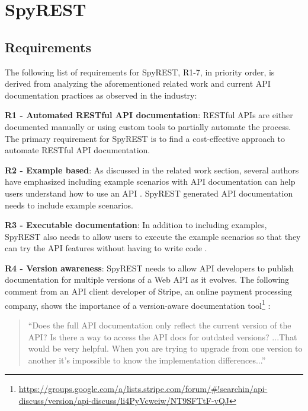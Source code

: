 \documentclass[conference]{IEEEtran}
\begin{document}
\section{SpyREST} %
\label{sec:spyrest}

\subsection{Requirements} %
\label{sub:spyrest_requirements}

The following list of requirements for SpyREST, R1-7, in priority order, is derived from analyzing the aforementioned related work and current API documentation practices as observed in the industry:

  \textbf{R1 - Automated RESTful API documentation}: RESTful APIs are either documented manually or using custom tools to partially automate the process. The primary requirement for SpyREST is to find a cost-effective approach to automate RESTful API documentation.

  \textbf{R2 - Example based}: As discussed in the related work section, several authors have emphasized including example scenarios with API documentation can help users understand how to use an API \cite{Robillard_what_makes, Kuhn_on_designing, Hoffman_api_documentation,Nasehi_what_makes}. SpyREST generated API documentation needs to include example scenarios.

  \textbf{R3 - Executable documentation}: In addition to including examples, SpyREST also needs to allow users to execute the example scenarios so that they can try the API features without having to write code \cite{Hoffman_api_documentation, Myers_study}.

  \textbf{R4 - Version awareness}: SpyREST needs to allow API developers to publish documentation for multiple versions of a Web API as it evolves. The following comment from an API client developer of Stripe, an online payment processing company, shows the importance of a version-aware documentation tool\footnote{\url{https://groups.google.com/a/lists.stripe.com/forum/#!searchin/api-discuss/version/api-discuss/li4PyVcweiw/NT9SFTtF-vQJ}}
:
  \small
  \begin{quotation}
   ``Does the full API documentation only reflect the current version of the
    API?  Is there a way to access the API docs for outdated versions? ...That would be very helpful. When you are trying to upgrade from one version to another it's impossible to know the implementation differences...''
  \end{quotation}
  \normalsize
\end{document}
